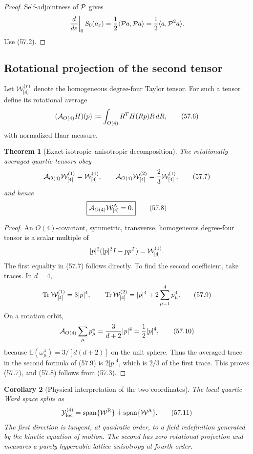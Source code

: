 \documentclass[11pt,oneside]{book}
\newtheorem{theorem}{Theorem}[chapter]
\newtheorem{corollary}[theorem]{Corollary}
\theoremstyle{definition}
\theoremstyle{remark}
\newcommand{\Tr}{\operatorname{Tr}}
\begin{document}
\begin{proof}
Self-adjointness of \({\cal P}\) gives
\[
 \left.\frac d{d\varepsilon}\right|_0S_0(a_\varepsilon)
 =\frac12\langle{\cal P}a,{\cal P}a\rangle
 =\frac12\langle a,{\cal P}^2a\rangle.
\]
Use (57.2).
\end{proof}

\subsection{Rotational projection of the second tensor}

Let \({\cal W}^{(r)}_{[4]}\) denote the homogeneous degree-four
Taylor tensor.  For such a tensor define its rotational average
\[
 ({\cal A}_{O(4)}H)(p)
 :=\int_{O(4)}R^TH(Rp)R\,dR,                                 \tag{57.6}
\]
with normalized Haar measure.

\begin{theorem}[Exact isotropic--anisotropic decomposition]
\label{thm:e8v57-rotational-decomposition}
The rotationally averaged quartic tensors obey
\[
 {\cal A}_{O(4)}{\cal W}^{(1)}_{[4]}
 ={\cal W}^{(1)}_{[4]},\qquad
 {\cal A}_{O(4)}{\cal W}^{(2)}_{[4]}
 =\frac23{\cal W}^{(1)}_{[4]},                               \tag{57.7}
\]
and hence
\[
 \boxed{
 {\cal A}_{O(4)}{\cal W}^{\rm A}_{[4]}=0.}                    \tag{57.8}
\]
\end{theorem}

\begin{proof}
An \(O(4)\)-covariant, symmetric, transverse, homogeneous
degree-four tensor is a scalar multiple of
\[
 |p|^2(|p|^2I-pp^T)={\cal W}^{(1)}_{[4]}.
\]
The first equality in (57.7) follows directly.  To find the second
coefficient, take traces.  In \(d=4\),
\[
 \Tr{\cal W}^{(1)}_{[4]}=3|p|^4,\qquad
 \Tr{\cal W}^{(2)}_{[4]}
 =|p|^4+2\sum_{\mu=1}^4p_\mu^4.                              \tag{57.9}
\]
On a rotation orbit,
\[
 {\cal A}_{O(4)}\sum_\mu p_\mu^4
 =\frac{3}{d+2}|p|^4=\frac12|p|^4,                           \tag{57.10}
\]
because
\(\mathbb E(\omega_\mu^4)=3/[d(d+2)]\) on the unit sphere.
Thus the averaged trace in the second formula of (57.9) is
\(2|p|^4\), which is \(2/3\) of the first trace.  This proves
(57.7), and (57.8) follows from (57.3).
\end{proof}

\begin{corollary}[Physical interpretation of the two coordinates]
\label{cor:e8v57-two-interpretations}
The local quartic Ward space splits as
\[
 {\cal Y}^{(4)}_{\rm loc}
 =\operatorname{span}\{{\cal W}^{\rm R}\}
  \mathbin{\dotplus}
  \operatorname{span}\{{\cal W}^{\rm A}\}.                   \tag{57.11}
\]
The first direction is tangent, at quadratic order, to a field
redefinition generated by the kinetic equation of motion.  The
second has zero rotational projection and measures a purely
hypercubic lattice anisotropy at fourth order.
\end{corollary}
\end{document}
